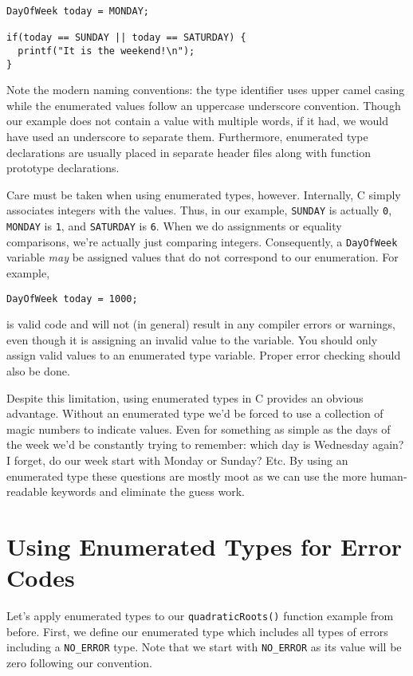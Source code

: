 \begin{verbatim}
DayOfWeek today = MONDAY;

if(today == SUNDAY || today == SATURDAY) {
  printf("It is the weekend!\n");
}
\end{verbatim}

Note the modern naming conventions: the type identifier uses 
upper camel casing while the enumerated values follow an 
uppercase underscore convention.  Though our example does
not contain a value with multiple words, if it had, we would have
used an underscore to separate them.  Furthermore, enumerated
type declarations are usually placed in separate header files
along with function prototype declarations.  

Care must be taken when using enumerated types, however.  
Internally, C simply associates integers with the values.  Thus, 
in our example, \texttt{SUNDAY} is actually \texttt{0}, 
\texttt{MONDAY} is \texttt{1}, and 
\texttt{SATURDAY} is \texttt{6}.  When we do
assignments or equality comparisons, we're actually just
comparing integers.  Consequently, a \texttt{DayOfWeek} 
variable \emph{may}
be assigned values that do not correspond to our enumeration. 
For example, 

\texttt{DayOfWeek today = 1000;}

is valid code and will not (in general) result in any compiler errors
or warnings, even though it is assigning an invalid value to the 
variable.  You should only assign valid values to an
enumerated type variable.  Proper error checking should also
be done.

Despite this limitation, using enumerated types in C provides an
obvious advantage.  Without an enumerated type we'd be forced
to use a collection of \glspl{magic number} to indicate values.  
Even for something as simple as the days of the week we'd be
constantly trying to remember: which day is Wednesday again?
I forget, do our week start with Monday or Sunday?  Etc.  By
using an enumerated type these questions are mostly moot as
we can use the more human-readable keywords and eliminate
the guess work.

\section{Using Enumerated Types for Error Codes}

Let's apply enumerated types to our \texttt{quadraticRoots()}
function example from before.  First, we define our enumerated
type which includes all types of errors including a \texttt{NO_ERROR}
type.  Note that we start with \texttt{NO_ERROR} as its value
will be zero following our convention.

